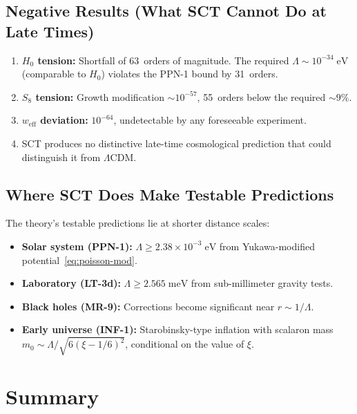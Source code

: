 \documentclass[11pt,a4paper]{article}
\newcommand{\Lam}{\Lambda}
\theoremstyle{plain}
\theoremstyle{definition}
\begin{document}
\subsection{Negative Results (What SCT Cannot Do at Late Times)}

\begin{enumerate}[nosep]
  \item \textbf{$H_0$ tension:} Shortfall of 63~orders of magnitude.
    The required $\Lam \sim 10^{-34}\;\mathrm{eV}$ (comparable to $H_0$)
    violates the PPN-1 bound by 31~orders.
  \item \textbf{$S_8$ tension:} Growth modification $\sim 10^{-57}$,
    55~orders below the required ${\sim}9\%$.
  \item \textbf{$w_{\mathrm{eff}}$ deviation:} $10^{-64}$, undetectable
    by any foreseeable experiment.
  \item SCT produces no distinctive late-time cosmological prediction
    that could distinguish it from $\Lam$CDM.
\end{enumerate}

\subsection{Where SCT Does Make Testable Predictions}

The theory's testable predictions lie at shorter distance scales:

\begin{itemize}[nosep]
  \item \textbf{Solar system (PPN-1):}
    $\Lam \geq 2.38 \times 10^{-3}\;\mathrm{eV}$ from
    Yukawa-modified potential~\eqref{eq:poisson-mod}.
  \item \textbf{Laboratory (LT-3d):}
    $\Lam \geq 2.565\;\mathrm{meV}$ from sub-millimeter gravity tests.
  \item \textbf{Black holes (MR-9):} Corrections become significant
    near $r \sim 1/\Lam$.
  \item \textbf{Early universe (INF-1):}
    Starobinsky-type inflation with scalaron mass
    $m_0 \sim \Lam/\sqrt{6(\xi - 1/6)^2}$, conditional on the value of
    $\xi$.
\end{itemize}

\section{Summary}\label{sec:summary}
\end{document}
